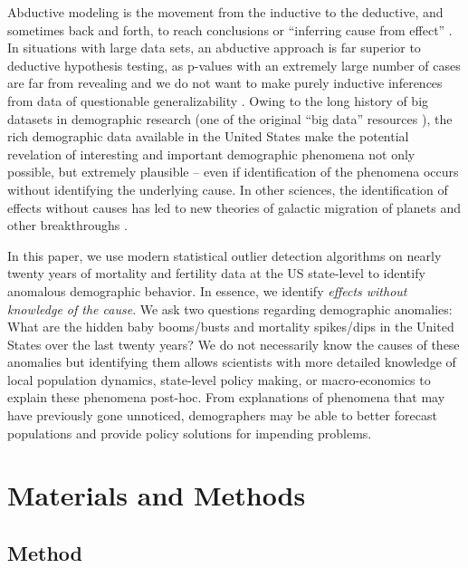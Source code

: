 \documentclass[12pt]{article}
\begin{document}
Abductive modeling is the movement from the inductive to the deductive,
and sometimes back and forth, to reach conclusions
\citep{bryant2014realm} or ``inferring cause from effect''
\citep{Crowder2017}. In situations with large data sets, an abductive
approach is far superior to deductive hypothesis testing, as p-values
with an extremely large number of cases are far from revealing
\citep{head2015extent, nuzzo2014scientific} and we do not want to make
purely inductive inferences from data of questionable generalizability
\citep{ruggles2014big}. Owing to the long history of big datasets in
demographic research (one of the original ``big data'' resources
\citep{ruggles2014big}), the rich demographic data available in the
United States make the potential revelation of interesting and important
demographic phenomena not only possible, but extremely plausible -- even
if identification of the phenomena occurs without identifying the
underlying cause. In other sciences, the identification of effects
without causes has led to new theories of galactic migration of planets
and other breakthroughs \citep{gomes2005n}.

In this paper, we use modern statistical outlier detection algorithms
\citep{chen1993joint} on nearly twenty years of mortality and fertility
data at the US state-level to identify anomalous demographic behavior.
In essence, we identify \emph{effects without knowledge of the cause}.
We ask two questions regarding demographic anomalies: What are the
hidden baby booms/busts and mortality spikes/dips in the United States
over the last twenty years? We do not necessarily know the causes of
these anomalies but identifying them allows scientists with more
detailed knowledge of local population dynamics, state-level policy
making, or macro-economics to explain these phenomena post-hoc. From
explanations of phenomena that may have previously gone unnoticed,
demographers may be able to better forecast populations and provide
policy solutions for impending problems.

\hypertarget{materials-and-methods}{%
\section{Materials and Methods}\label{materials-and-methods}}

\hypertarget{method}{%
\subsection{Method}\label{method}}
\end{document}

